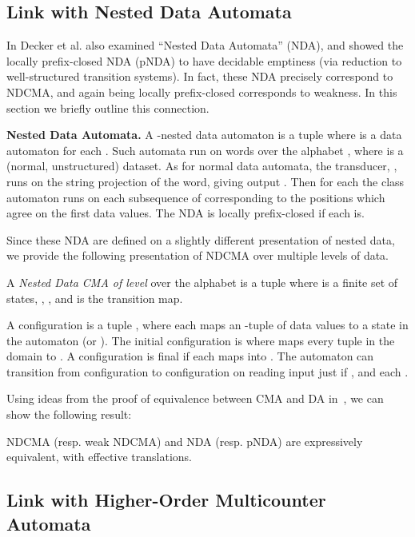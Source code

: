 \subsection{Link with Nested Data Automata}
In \cite{Decker14} Decker et al. also examined ``Nested Data Automata'' (NDA), and showed the locally prefix-closed NDA (pNDA) to have decidable emptiness (via reduction to well-structured transition systems).  In fact, these NDA precisely correspond to NDCMA, and again being locally prefix-closed corresponds to weakness. In this section we briefly outline this connection.

\textbf{Nested Data Automata.}  A -nested data automaton is a tuple  where  is a data automaton for each .  Such automata run on words over the alphabet , where  is a (normal, unstructured) dataset.  As for normal data automata, the transducer, , runs on the string projection of the word, giving output .  Then for each  the class automaton  runs on each subsequence of  corresponding to the positions which agree on the first  data values.   The NDA is locally prefix-closed if each  is.

Since these NDA are defined on a slightly different presentation of nested data, we provide the following presentation of NDCMA over multiple levels of data.
\begin{definition}
A \emph{Nested Data CMA of level } over the alphabet  is a tuple  where  is a finite set of states, , , and  is the transition map.

A configuration is a tuple , where each  maps an -tuple of data values to a state in the automaton (or ).  The initial configuration is  where  maps every tuple in the domain to .  A configuration  is final if each  maps into .  The automaton can transition from configuration  to configuration  on reading input  just if , and each .  
\end{definition}
Using ideas from the proof of equivalence between CMA and DA in~\cite{bjorklund10}, we can show the following result:
\begin{theorem}\label{thm:NDCMA-pNDA}
NDCMA (resp. weak NDCMA) and NDA (resp. pNDA) are expressively equivalent, with effective translations.
\end{theorem}

\subsection{Link with Higher-Order Multicounter Automata}

